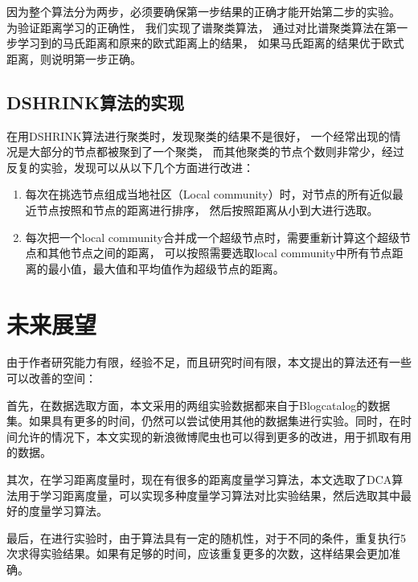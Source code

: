 因为整个算法分为两步，必须要确保第一步结果的正确才能开始第二步的实验。
为验证距离学习的正确性，
我们实现了谱聚类算法，
通过对比谱聚类算法在第一步学习到的马氏距离和原来的欧式距离上的结果，
如果马氏距离的结果优于欧式距离，则说明第一步正确。

\subsection{DSHRINK算法的实现}

在用DSHRINK算法进行聚类时，发现聚类的结果不是很好，
一个经常出现的情况是大部分的节点都被聚到了一个聚类，
而其他聚类的节点个数则非常少，经过反复的实验，发现可以从以下几个方面进行改进：

\begin{enumerate}
\item 每次在挑选节点组成当地社区（Local community）时，对节点的所有近似最近节点按照和节点的距离进行排序，
然后按照距离从小到大进行选取。
\item 每次把一个local community合并成一个超级节点时，需要重新计算这个超级节点和其他节点之间的距离，
可以按照需要选取local community中所有节点距离的最小值，最大值和平均值作为超级节点的距离。
\end{enumerate}

\section{未来展望}

由于作者研究能力有限，经验不足，而且研究时间有限，本文提出的算法还有一些可以改善的空间：

首先，在数据选取方面，本文采用的两组实验数据都来自于Blogcatalog的数据集。如果具有更多的时间，仍然可以尝试使用其他的数据集进行实验。同时，在时间允许的情况下，本文实现的新浪微博爬虫也可以得到更多的改进，用于抓取有用的数据。

其次，在学习距离度量时，现在有很多的距离度量学习算法，本文选取了DCA算法用于学习距离度量，可以实现多种度量学习算法对比实验结果，然后选取其中最好的度量学习算法。

最后，在进行实验时，由于算法具有一定的随机性，对于不同的条件，重复执行5次求得实验结果。如果有足够的时间，应该重复更多的次数，这样结果会更加准确。
